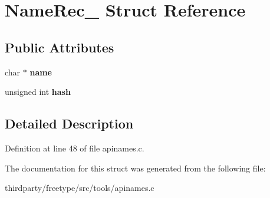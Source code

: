 \hypertarget{struct_name_rec__}{}\section{Name\+Rec\+\_\+ Struct Reference}
\label{struct_name_rec__}
\subsection*{Public Attributes}
\begin{DoxyCompactItemize}
\item 
\mbox{\label{struct_name_rec___a0948afa3916e5316e5a79d0a7958360a}} 
char $\ast$ {\bfseries name}
\item 
\mbox{\label{struct_name_rec___abaf93b3d85d7692e234ccad0c25e3f93}} 
unsigned int {\bfseries hash}
\end{DoxyCompactItemize}


\subsection{Detailed Description}


Definition at line 48 of file apinames.\+c.



The documentation for this struct was generated from the following file\+:\begin{DoxyCompactItemize}
\item 
thirdparty/freetype/src/tools/apinames.\+c\end{DoxyCompactItemize}
